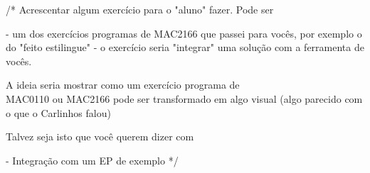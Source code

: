 /*
Acrescentar algum exercício para o "aluno" fazer.
Pode ser

- um dos exercícios programas de MAC2166 que passei para
vocês, por exemplo o do "feito estilingue"
- o exercício seria "integrar" uma solução com a ferramenta de
vocês.

A ideia seria mostrar como um exercício programa de \\
MAC0110 ou MAC2166 pode ser transformado em algo visual (algo parecido com o que o Carlinhos falou)

Talvez seja isto que você querem dizer com

-  Integração com um EP de exemplo
*/

